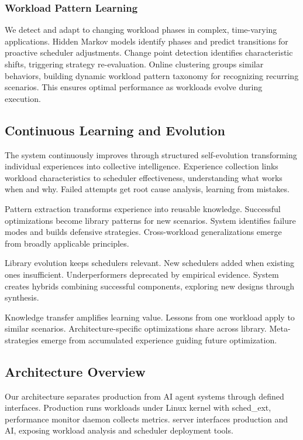 \subsubsection{Workload Pattern Learning}
We detect and adapt to changing workload phases in complex, time-varying applications. Hidden Markov models identify phases and predict transitions for proactive scheduler adjustments. Change point detection identifies characteristic shifts, triggering strategy re-evaluation. Online clustering groups similar behaviors, building dynamic workload pattern taxonomy for recognizing recurring scenarios. This ensures optimal performance as workloads evolve during execution.

\subsection{Continuous Learning and Evolution}

The system continuously improves through structured self-evolution transforming individual experiences into collective intelligence. Experience collection links workload characteristics to scheduler effectiveness, understanding what works when and why. Failed attempts get root cause analysis, learning from mistakes.

Pattern extraction transforms experience into reusable knowledge. Successful optimizations become library patterns for new scenarios. System identifies failure modes and builds defensive strategies. Cross-workload generalizations emerge from broadly applicable principles.

Library evolution keeps schedulers relevant. New schedulers added when existing ones insufficient. Underperformers deprecated by empirical evidence. System creates hybrids combining successful components, exploring new designs through synthesis.

Knowledge transfer amplifies learning value. Lessons from one workload apply to similar scenarios. Architecture-specific optimizations share across library. Meta-strategies emerge from accumulated experience guiding future optimization.

\subsection{Architecture Overview}

Our architecture separates production from AI agent systems through defined interfaces. Production runs workloads under Linux kernel with sched\_ext, performance monitor daemon collects metrics. \sys server interfaces production and AI, exposing workload analysis and scheduler deployment tools.

